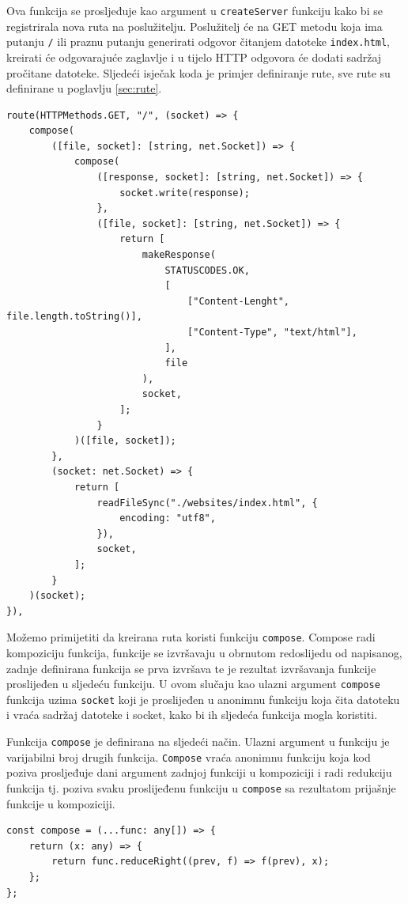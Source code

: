 \documentclass[]{foi}
\begin{document}
Ova funkcija se prosljeđuje kao argument u \texttt{createServer} funkciju kako bi se
registrirala nova ruta na poslužitelju. Poslužitelj će na GET metodu koja ima putanju
\texttt{/} ili praznu putanju generirati odgovor čitanjem datoteke \texttt{index.html},
kreirati će odgovarajuće zaglavlje i u tijelo HTTP odgovora će dodati sadržaj pročitane
datoteke. Sljedeći isječak koda je primjer definiranje rute, sve rute su definirane u
poglavlju \ref{sec:rute}.
\begin{lstlisting}[caption={Primjer rute}, label=lst:primjer_rute]
route(HTTPMethods.GET, "/", (socket) => {
    compose(
        ([file, socket]: [string, net.Socket]) => {
            compose(
                ([response, socket]: [string, net.Socket]) => {
                    socket.write(response);
                },
                ([file, socket]: [string, net.Socket]) => {
                    return [
                        makeResponse(
                            STATUSCODES.OK,
                            [
                                ["Content-Lenght", file.length.toString()],
                                ["Content-Type", "text/html"],
                            ],
                            file
                        ),
                        socket,
                    ];
                }
            )([file, socket]);
        },
        (socket: net.Socket) => {
            return [
                readFileSync("./websites/index.html", {
                    encoding: "utf8",
                }),
                socket,
            ];
        }
    )(socket);
}),
\end{lstlisting}

Možemo primijetiti da kreirana ruta koristi funkciju \texttt{compose}. Compose radi
kompoziciju funkcija, funkcije se izvršavaju u obrnutom redoslijedu od napisanog,
zadnje definirana funkcija se prva izvršava te je rezultat izvršavanja funkcije
proslijeđen u sljedeću funkciju. U ovom slučaju kao ulazni argument \texttt{compose} funkcija
uzima \texttt{socket} koji je proslijeđen u anonimnu funkciju koja čita datoteku i vraća
sadržaj datoteke i socket, kako bi ih sljedeća funkcija mogla koristiti.

Funkcija \texttt{compose} je definirana na sljedeći način. Ulazni argument u funkciju je
varijabilni broj drugih funkcija. \texttt{Compose} vraća anonimnu funkciju koja kod poziva
prosljeđuje dani argument zadnjoj funkciji u kompoziciji i radi redukciju funkcija tj.
poziva svaku proslijeđenu funkciju u \texttt{compose} sa rezultatom prijašnje funkcije
u kompoziciji.
\begin{lstlisting}[caption={Definicija compose funkcije}, label=lst:compose_funkcija]
const compose = (...func: any[]) => {
    return (x: any) => {
        return func.reduceRight((prev, f) => f(prev), x);
    };
};
\end{lstlisting}
\end{document}
